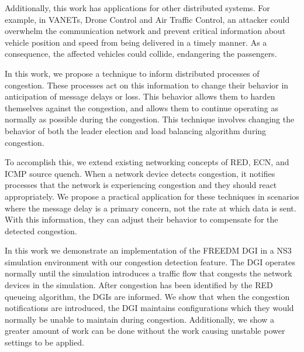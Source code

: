 Additionally, this work has applications for other distributed systems.
For example, in \ac{VANET}s\cite{CARS1}\cite{CARS2}, Drone Control and Air Traffic Control\cite{AIRTRAFFIC1}\cite{AIRTRAFFIC2},  an attacker could overwhelm the communication network and prevent critical information about vehicle position and speed from being delivered in a timely manner.
As a consequence, the affected vehicles could collide, endangering the passengers.

In this work, we propose a technique to inform distributed processes of congestion.
These processes act on this information to change their behavior in anticipation of message delays or loss.
This behavior allows them to harden themselves against the congestion, and allows them to continue operating as normally as possible during the congestion.
This technique involves changing the behavior of both the leader election\cite{INVITATIONELECTION} and load balancing algorithm during congestion.

To accomplish this, we extend existing networking concepts of \ac{RED}, \ac{ECN}\cite{RFCECN}, and ICMP source quench\cite{RFCSOURCEQUENCH}.
When a network device detects congestion, it notifies processes that the network is experiencing congestion and they should react appropriately.
We propose a practical application for these techniques in scenarios where the message delay is a primary concern, not the rate at which data is sent.
With this information, they can adjust their behavior to compensate for the detected congestion.

In this work we demonstrate an implementation of the \ac{FREEDM} \ac{DGI} in a \ac{NS3} simulation environment\cite{NS3} with our congestion detection feature.
The \ac{DGI} operates normally until the simulation introduces a traffic flow that congests the network devices in the simulation.
After congestion has been identified by the \ac{RED} queueing algorithm, the \ac{DGI}s are informed. %
We show that when the congestion notifications are introduced, the \ac{DGI} maintains configurations which they would normally be unable to maintain during congestion.
Additionally, we show a greater amount of work can be done without the work causing unstable power settings to be applied.

